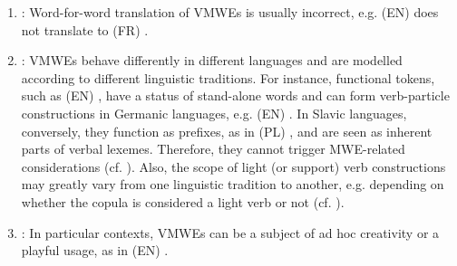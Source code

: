 \documentclass[output=paper,
modfonts,
]{langscibook}
\begin{document}
\begin{enumerate}
\item\label{prop:trans}:  Word-for-word translation of VMWEs is usually incorrect, e.g. (EN)  does not translate to (FR) . 
\item\label{prop:multi}: VMWEs behave differently in different languages and are modelled according to different linguistic traditions. For instance, functional tokens, such as (EN) , have a status of stand-alone words and can form verb-particle constructions in Germanic languages, e.g. (EN) . In Slavic languages, conversely, they function as prefixes, as in (PL) , and are seen as inherent parts of verbal lexemes. Therefore, they cannot trigger MWE-related considerations (cf. ). Also, the scope of light (or support) verb constructions may greatly vary from one linguistic tradition to another, e.g. depending on whether the copula  is considered a light verb or not (cf. ).



\item\label{prop:create} : In particular contexts, VMWEs can be a subject of ad hoc creativity or a playful usage, as in (EN) . %
\end{enumerate}
\end{document}
